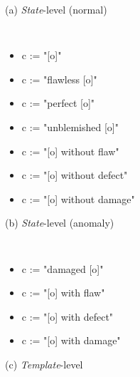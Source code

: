 \begin{figure*}
\noindent\begin{minipage}[t]{0.32\linewidth}
(a) \emph{State}-level (normal)

{\tt \small
\begin{itemize}
    \item c := "[o]"
    \item c := "flawless [o]"
    \item c := "perfect [o]"
    \item c := "unblemished [o]"
    \item c := "[o] without flaw"
    \item c := "[o] without defect"
    \item c := "[o] without damage"
\end{itemize}
}

(b) \emph{State}-level (anomaly)

{\tt \small
\begin{itemize}
    \item c := "damaged [o]"
    \item c := "[o] with flaw"
    \item c := "[o] with defect"
    \item c := "[o] with damage"
\end{itemize}
}
\end{minipage}
\hfill
\begin{minipage}[t]{0.33\linewidth}
(c) \emph{Template}-level


\end{minipage}
\end{figure*}
